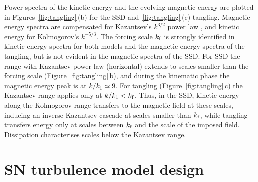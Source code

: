 \documentclass[preprint2]{aastex63}
\newcommand\kf{k_{\rm f} }
\newcommand{\fg}[1]{\textcolor{midgreen}{#1}}
\begin{document}
 \fg{Power spectra of the kinetic energy and the
 evolving magnetic energy are plotted in Figures~\ref{fig:tangling}\,(b) for the
 SSD and~\ref{fig:tangling}\,(c) tangling.}
 Magnetic energy spectra are compensated \fg{for} Kazantsev's $k^{3/2}$
 \fg{power law} \citep{Sch02,BS14}, and kinetic energy \fg{for}
 Kolmogorov's $k^{-5/3}$.
 The forcing scale $\kf$ is strongly \fg{identified} in kinetic
 energy \fg{spectra for both models} and the magnetic energy \fg{spectra of
 the tangling}, but
 \fg{is not evident in the magnetic spectra of the SSD}.
 \fg{For SSD the range with Kazantsev power law (horizontal) extends to scales
 smaller than the forcing scale (Figure~\ref{fig:tangling}\,b), and during the
 kinematic phase the magnetic energy peak is at $k/k_1\simeq9$.}
 \fg{For tangling (Figure~\ref{fig:tangling}\,c) the Kazantsev range applies
 only at $k/k_1<\kf$.}
 Thus, in the SSD, kinetic energy along the Kolmogorov range transfers to
 the magnetic field at these scales, inducing an inverse Kazantsev \fg{cascade}
 at scales \fg{smaller than} $\kf$, while tangling transfers energy only at
 scales between
 $\kf$ and the scale of the imposed field.
 Dissipation \fg{characterises} scales below the Kazantsev range.
 
\section{SN turbulence model design} \label{sec:model}
\end{document}
